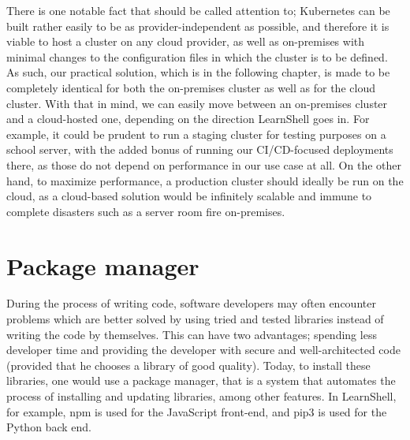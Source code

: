 \documentclass[thesis=B,english]{FITthesis}[2019/12/23]
\begin{document}
There is one notable fact that should be called attention to; Kubernetes can be built rather easily to be as provider-independent as possible, and therefore it is viable to host a cluster on any cloud provider, as well as on-premises with minimal changes to the configuration files in which the cluster is to be defined. As such, our practical solution, which is in the following chapter, is made to be completely identical for both the on-premises cluster as well as for the cloud cluster. 
With that in mind, we can easily move between an on-premises cluster and a cloud-hosted one, depending on the direction LearnShell goes in. For example, it could be prudent to run a staging cluster for testing purposes on a school server, with the added bonus of running our CI/CD-focused deployments there, as those do not depend on performance in our use case at all. On the other hand, to maximize performance, a production cluster should ideally be run on the cloud, as a cloud-based solution would be infinitely scalable and immune to complete disasters such as a server room fire on-premises. 

\section{Package manager}

During the process of writing code, software developers may often encounter problems which are better solved by using tried and tested libraries instead of writing the code by themselves. This can have two advantages; spending less developer time and providing the developer with secure and well-architected code (provided that he chooses a library of good quality). Today, to install these libraries, one would use a package manager, that is a system that automates the process of installing and updating libraries, among other features. In LearnShell, for example, npm is used for the JavaScript front-end, and pip3 is used for the Python back end.
\end{document}
